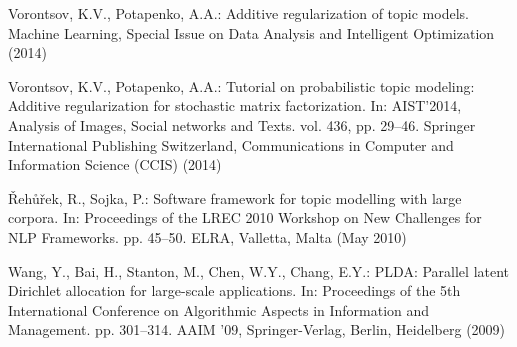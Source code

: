 \documentclass[russian,english]{llncs}
\begin{document}
\begin{thebibliography}{10}
Vorontsov, K.V., Potapenko, A.A.: Additive regularization of topic models.
  Machine Learning, Special Issue on Data Analysis and Intelligent Optimization
   (2014)

Vorontsov, K.V., Potapenko, A.A.: Tutorial on probabilistic topic modeling:
  Additive regularization for stochastic matrix factorization. In: AIST'2014,
  Analysis of Images, Social networks and Texts. vol. 436, pp. 29--46. Springer
  International Publishing Switzerland, Communications in Computer and
  Information Science (CCIS) (2014)

\v{R}eh\r{u}\v{r}ek, R., Sojka, P.: Software framework for topic modelling with
  large corpora. In: Proceedings of the {LREC} 2010 Workshop on New Challenges
  for {NLP} Frameworks. pp. 45--50. {ELRA}, Valletta, Malta (May 2010)

Wang, Y., Bai, H., Stanton, M., Chen, W.Y., Chang, E.Y.: {PLDA}: Parallel
  latent {D}irichlet allocation for large-scale applications. In: Proceedings
  of the 5th International Conference on Algorithmic Aspects in Information and
  Management. pp. 301--314. AAIM '09, Springer-Verlag, Berlin, Heidelberg
  (2009)

\end{thebibliography}
\end{document}
